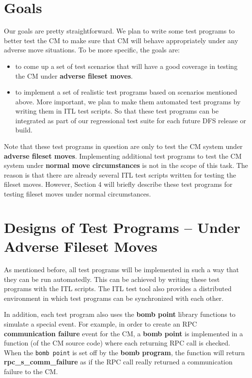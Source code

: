 \pagebreak
\section{Goals}

Our goals are pretty straightforward. We plan to write some test programs 
to better test the CM to make sure that CM will behave appropriately under
any adverse move situations. To be more specific, the goals are:
\begin{itemize}
\item to come up a set of test scenarios that will have a good coverage
in testing the CM under {\bf adverse fileset moves}. 
\item to implement a set of realistic test programs based on scenarios 
mentioned above. More important, we plan to make them automated test programs
by writing them in ITL test scripts. So that these test
programs can be integrated as part of our regressional test suite
for each future DFS release or build. 
\end{itemize}

Note that these test programs in question are only to test the CM system under
{\bf adverse fileset moves}. Implementing additional test programs to test the
CM system under {\bf normal move circumstances} is not in the scope of this 
task. 
The reason is that there are already several ITL test scripts written 
for testing the fileset moves.  
However, Section 4 will briefly
describe these test programs for testing fileset moves under normal 
circumstances. 

\section {Designs of Test Programs -- Under Adverse Fileset Moves}

As mentioned before, all test programs will be implemented in such a way
that they can be run automatedly. This can be achieved by writing these
test programs with the ITL scripts. The ITL test tool also provides a 
distributed environment in which test programs can be synchronized with each 
other. 

In addition, each test program also uses the {\bf bomb point} library 
functions to simulate a special event. For example, in order to create 
an RPC {\bf communication failure} event for the CM, a {\bf bomb point} is 
implemented in a function (of the CM source code) where each returning RPC call
is checked. When the {\tt bomb point} is set off by the {\bf bomb program}, 
the function will return {\bf rpc_s_comm_failure} as if the RPC call really 
returned a communication failure to the CM. 

